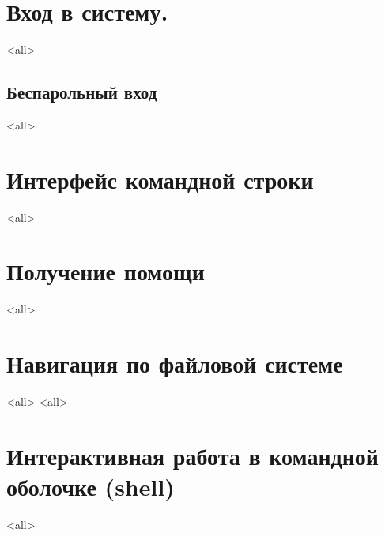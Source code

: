 \section{Вход в систему.}
\mode<all>{}
\subsection{Беспарольный вход}
\mode<all>{}

\section{Интерфейс командной строки}
\mode<all>{}

\section{Получение помощи}
\mode<all>{}


\section{Навигация по файловой системе}
\mode<all>{}
\mode<all>{}

\section{Интерактивная работа в командной оболочке (shell)}
\mode<all>{}



\bye
